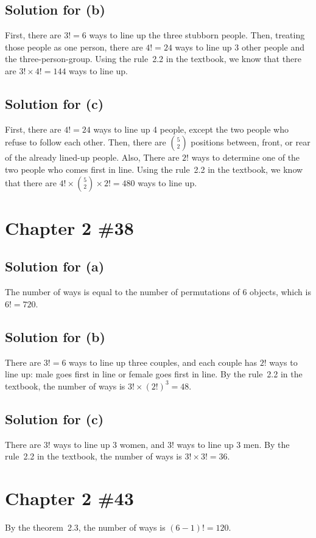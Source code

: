 \documentclass{scrartcl}
\begin{document}
\subsection{Solution for (b)}
First, there are \(3! = 6\) ways to line up the three stubborn people. Then,
treating those people as one person, there are \(4! = 24\) ways to line up 3
other people and the three-person-group. Using the rule~2.2 in the textbook,
we know that there are \(3! \times 4! = 144\) ways to line up.

\subsection{Solution for (c)}
First, there are \(4! = 24\) ways to line up 4 people, except the two people
who refuse to follow each other. Then, there are \(5 \choose 2\) positions
between, front, or rear of the already lined-up people. Also, There are \(2!\)
ways to determine one of the two people who comes first in line. Using the
rule~2.2 in the textbook, we know that there are
\(4! \times {5 \choose 2} \times 2! = 480\) ways to line up.

\section{Chapter 2 \#38}
\subsection{Solution for (a)}
The number of ways is equal to the number of permutations of 6 objects, which
is \(6! = 720\).

\subsection{Solution for (b)}
There are \(3! = 6\) ways to line up three couples, and each couple has \(2!\)
ways to line up: male goes first in line or female goes first in line. By the
rule~2.2 in the textbook, the number of ways is \(3! \times (2!)^3 = 48\).

\subsection{Solution for (c)}
There are \(3!\) ways to line up 3 women, and \(3!\) ways to line up 3 men. By
the rule~2.2 in the textbook, the number of ways is \(3! \times 3! = 36\).

\section{Chapter 2 \#43}
By the theorem~2.3, the number of ways is \((6 - 1)! = 120\).
\end{document}
